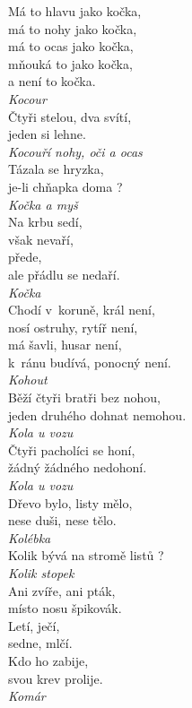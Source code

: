 \begin{multicols}{4}
\noindent
Má to hlavu jako kočka,\\
má to nohy jako kočka,\\
má to ocas jako kočka,\\
mňouká to jako kočka,\\
a není to kočka.\\[1 mm]
{\sl Kocour}\\

\noindent
Čtyři stelou, dva svítí,\\
jeden si lehne.\\[1 mm]
{\sl Kocouří nohy, oči a ocas}\\

\noindent
Tázala se hryzka,\\
je-li chňapka doma ?\\[1 mm]
{\sl Kočka a myš}\\

\noindent
Na krbu sedí,\\
však nevaří,\\
přede,\\
ale přádlu se nedaří.\\[1 mm]
{\sl Kočka}\\

\noindent
Chodí v~koruně, král není,\\
nosí ostruhy, rytíř není,\\
má šavli, husar není,\\
k~ránu budívá, ponocný není.\\[1 mm]
{\sl Kohout}\\

\noindent
Běží čtyři bratři bez nohou,\\
jeden druhého dohnat nemohou.\\[1 mm]
{\sl Kola u vozu}\\

\noindent
Čtyři pacholíci se honí,\\
žádný žádného nedohoní.\\[1 mm]
{\sl Kola u vozu}\\

\noindent
Dřevo bylo, listy mělo,\\
nese duši, nese tělo.\\[1 mm]
{\sl Kolébka}\\

\noindent
Kolik bývá na stromě listů ?\\[1 mm]
{\sl Kolik stopek}\\

\noindent
Ani zvíře, ani pták,\\
místo nosu špikovák.\\
Letí, ječí,\\
sedne, mlčí.\\
Kdo ho zabije,\\
svou krev prolije.\\[1 mm]
{\sl Komár}\\


\end{multicols}
